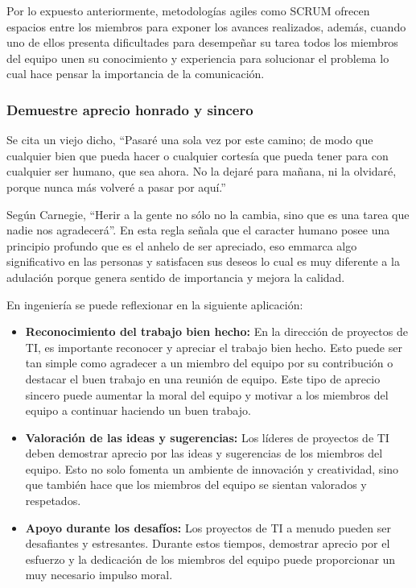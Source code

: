 \documentclass[journal]{IEEEtran}
\begin{document}
Por lo expuesto anteriormente, metodologías agiles como SCRUM ofrecen espacios entre los miembros para exponer los avances realizados, además, cuando uno de ellos presenta dificultades para desempeñar su tarea todos los miembros del equipo unen su conocimiento y experiencia para solucionar el problema lo cual hace pensar la importancia de la comunicación.

\subsubsection{Demuestre aprecio honrado y sincero}
Se cita un viejo dicho, “Pasaré una sola vez por este camino; de modo que cualquier bien que pueda hacer o cualquier cortesía que pueda tener para con cualquier ser humano, que sea ahora. No la dejaré para mañana, ni la olvidaré, porque nunca más volveré a pasar por aquí.”

Según Carnegie, “Herir a la gente no sólo no la cambia, sino que es una tarea que nadie nos agradecerá”. En esta regla señala que el caracter humano posee una principio profundo que es el anhelo de ser apreciado, eso emmarca algo significativo en las personas y satisfacen sus deseos lo cual es muy diferente a la adulación porque genera sentido de importancia y mejora la calidad.

En ingeniería se puede reflexionar en la siguiente aplicación:
\begin{itemize}
	\item \textbf{Reconocimiento del trabajo bien hecho:} En la dirección de proyectos de TI, es importante reconocer y apreciar el trabajo bien hecho. Esto puede ser tan simple como agradecer a un miembro del equipo por su contribución o destacar el buen trabajo en una reunión de equipo. Este tipo de aprecio sincero puede aumentar la moral del equipo y motivar a los miembros del equipo a continuar haciendo un buen trabajo.
	\item \textbf{Valoración de las ideas y sugerencias:} Los líderes de proyectos de TI deben demostrar aprecio por las ideas y sugerencias de los miembros del equipo. Esto no solo fomenta un ambiente de innovación y creatividad, sino que también hace que los miembros del equipo se sientan valorados y respetados.
	\item \textbf{Apoyo durante los desafíos:} Los proyectos de TI a menudo pueden ser desafiantes y estresantes. Durante estos tiempos, demostrar aprecio por el esfuerzo y la dedicación de los miembros del equipo puede proporcionar un muy necesario impulso moral.
\end{itemize}
\end{document}
